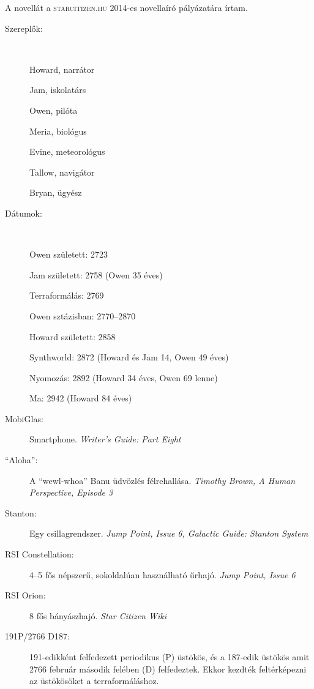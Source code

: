 \documentclass[10pt]{memoir}
\begin{document}
A novellát a \textsc{starcitizen.hu} 2014-es novellaíró pályázatára írtam.

\begin{description}

\item[Szereplők:] ~ \par
Howard, narrátor \par
Jam, iskolatárs \par
Owen, pilóta \par
Meria, biológus \par
Evine, meteorológus \par
Tallow, navigátor \par
Bryan, ügyész \par

\item[Dátumok:] ~ \par
Owen született: 2723 \par
Jam született: 2758 (Owen 35 éves) \par
Terraformálás: 2769 \par
Owen sztázisban: 2770--2870 \par
Howard született: 2858 \par
Synthworld: 2872 (Howard és Jam 14, Owen 49 éves) \par
Nyomozás: 2892 (Howard 34 éves, Owen 69 lenne) \par
Ma: 2942 (Howard 84 éves) \par

\item[MobiGlas:] Smartphone. \textit{Writer's Guide: Part Eight}

\item[``Aloha'':] A ``wewl-whoa'' Banu üdvözlés félrehallása. \textit{Timothy
Brown, A Human Perspective, Episode 3}

\item[Stanton:] Egy csillagrendszer. \textit{Jump Point, Issue 6, Galactic
Guide: Stanton System}

\item[RSI Constellation:] 4--5 fős népszerű, sokoldalúan használható űrhajó.
\textit{Jump Point, Issue 6}

\item[RSI Orion:] 8 fős bányászhajó. \textit{Star Citizen Wiki}

\item[191P/2766 D187:] 191-edikként felfedezett periodikus (P) üstökös, és a
187-edik üstökös amit 2766 február második felében (D) felfedeztek. Ekkor
kezdték feltérképezni az üstökösöket a terraformáláshoz.


\end{description}
\end{document}
